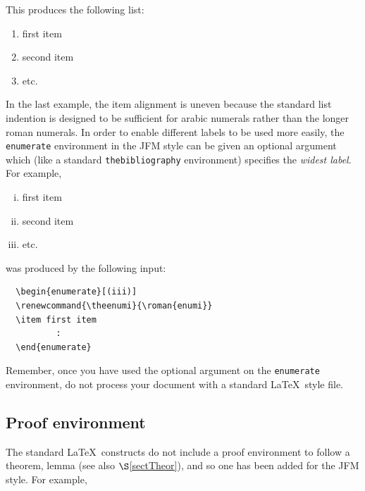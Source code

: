 \noindent
This produces the following list:
\begin{enumerate}
  \renewcommand{\theenumi}{\roman{enumi}}
  \item first item
  \item second item
  \item etc.
\end{enumerate}

In the last example, the item alignment is uneven because
the standard list indention is designed to be sufficient for arabic
numerals rather than the longer roman numerals. In order to enable
different labels to be used more easily, the \verb"enumerate" environment
in the JFM style can be given an optional argument which (like a standard
\verb"thebibliography" environment) specifies the {\em widest label}. For
example,
\begin{enumerate}[(iii)]
\renewcommand{\theenumi}{\roman{enumi}}
  \item first item
  \item second item
  \item etc.
\end{enumerate}
was produced by the following input:

\smallskip
\begin{verbatim}
  \begin{enumerate}[(iii)]
  \renewcommand{\theenumi}{\roman{enumi}}
  \item first item
          :
  \end{enumerate}
\end{verbatim}
\smallskip

Remember, once you have used the optional argument on the \verb"enumerate"
environment, do not process your document with a standard \LaTeX\ style file.




\subsection{Proof environment}

The standard \LaTeX\ constructs do not include a proof environment to
follow a theorem, lemma \etc (see also $\S$\ref{sectTheor}), and so one has
been added for the JFM style. For example,

